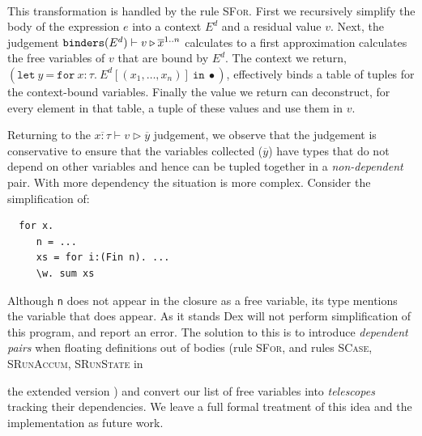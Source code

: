 \documentclass[acmsmall,screen,nonacm]{acmart}
\newcommand{\Infer}[3]{\ensuremath{\inferrule*[right={#1}]{#2}{#3}}}
\newcommand{\ttt}[1]{\texttt{#1}}
\newcommand{\tsc}[1]{\textsc{#1}}
\newcommand{\defunc}{~\rightsquigarrow~}
\newcommand{\letx}[3]{\ttt{let}~#1~\ttt{=}~#2~\ttt{in}~#3}
\newcommand{\view}[3]{\ttt{view}~#1\!:\!#2 .~ #3}
\newcommand{\forexpr}[3]{\ttt{for}~#1\!:\!#2 .~ #3}
\newif\ifextended
\begin{document}
\mbox{}\vspace{-0.25cm}\\

This transformation is handled by the rule \textsc{SFor}. %
First we recursively simplify the body of the expression $e$ into a context $E^d$ and a residual
value $v$. Next, the judgement ${\tt binders}(E^d)\vdash v \triangleright \overline{x}^{1..n}$ calculates
to a first approximation calculates the free variables of $v$ that are bound by $E^d$. The context
we return, $(\letx {y} {\forexpr x \tau E^d[(x_1,\ldots,x_n)]} \bullet)$, effectively binds a
table of tuples for the context-bound variables. Finally the value we return can
deconstruct, for every element in that table, a tuple of these values and use them in $v$.

Returning to the $\overline{x{:}\tau} \vdash v \triangleright \overline{y}$ judgement, we observe that
the judgement is conservative to ensure that the variables collected ($\overline{y}$) have types that
do not depend on other variables and hence can be tupled together in a {\em non-dependent} pair. With
more dependency the situation is more complex. Consider the simplification of:
\begin{verbatim}
  for x.
     n = ...
     xs = for i:(Fin n). ...
     \w. sum xs
\end{verbatim}
Although {\tt n} does not appear in the closure as a free variable, its type mentions the variable
that does appear. As it stands Dex will not perform simplification of this program, and report an error.
The solution to this is to introduce {\em dependent pairs} when floating definitions out of bodies
(rule \tsc{SFor}, and rules \tsc{SCase, SRunAccum, SRunState} in
\ifextended
\Cref{fig:defunctionalization-full}
\else
the extended version
\fi) and convert our list of free variables into {\em telescopes} tracking their dependencies. We leave a full formal treatment of this idea and the implementation as future work.
\end{document}
